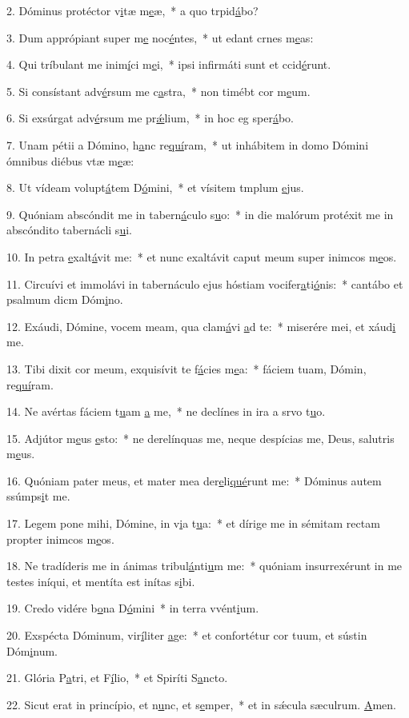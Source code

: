 2. Dóminus protéctor v\uline{i}tæ m\uline{e}æ,~* a quo trpid\uline{á}bo?\par 
3. Dum apprópiant super m\uline{e} noc\uline{é}ntes,~* ut edant crnes m\uline{e}as:\par 
4. Qui tríbulant me inim\uline{í}ci m\uline{e}i,~* ipsi infirmáti sunt et ccid\uline{é}runt.\par 
5. Si consístant adv\uline{é}rsum me c\uline{a}stra,~* non timébt cor m\uline{e}um.\par 
6. Si exsúrgat adv\uline{é}rsum me pr\uline{ǽ}lium,~* in hoc eg sper\uline{á}bo.\par 
7. Unam pétii a Dómino, h\uline{a}nc re\uline{quí}ram,~* ut inhábitem in domo Dómini ómnibus diébus vtæ m\uline{e}æ:\par 
8. Ut vídeam volupt\uline{á}tem D\uline{ó}mini,~* et vísitem tmplum \uline{e}jus.\par 
9. Quóniam abscóndit me in tabern\uline{á}culo s\uline{u}o:~* in die malórum protéxit me in abscóndito tabernácli s\uline{u}i.\par 
10. In petra \uline{e}xalt\uline{á}vit me:~* et nunc exaltávit caput meum super inimcos m\uline{e}os.\par 
11. Circuívi et immolávi in tabernáculo ejus hóstiam vocifer\uline{a}ti\uline{ó}nis:~* cantábo et psalmum dicm Dóm\uline{i}no.\par 
12. Exáudi, Dómine, vocem meam, qua clam\uline{á}vi \uline{a}d te:~* miserére mei, et xáud\uline{i} me.\par 
13. Tibi dixit cor meum, exquisívit te f\uline{á}cies m\uline{e}a:~* fáciem tuam, Dómin, re\uline{quí}ram.\par 
14. Ne avértas fáciem t\uline{u}am \uline{a} me,~* ne declínes in ira a srvo t\uline{u}o.\par 
15. Adjútor m\uline{e}us \uline{e}sto:~* ne derelínquas me, neque despícias me, Deus, salutris m\uline{e}us.\par 
16. Quóniam pater meus, et mater mea der\uline{e}li\uline{qué}runt me:~* Dóminus autem ssúmps\uline{i}t me.\par 
17. Legem pone mihi, Dómine, in v\uline{i}a t\uline{u}a:~* et dírige me in sémitam rectam propter inimcos m\uline{e}os.\par 
18. Ne tradíderis me in ánimas tribul\uline{á}nti\uline{u}m me:~* quóniam insurrexérunt in me testes iníqui, et mentíta est inítas s\uline{i}bi.\par 
19. Credo vidére b\uline{o}na D\uline{ó}mini~* in terra vvént\uline{i}um.\par 
20. Exspécta Dóminum, vir\uline{í}liter \uline{a}ge:~* et confortétur cor tuum, et sústin Dóm\uline{i}num.\par 
21. Glória P\uline{a}tri, et F\uline{í}lio,~* et Spiríti S\uline{a}ncto.\par 
22. Sicut erat in princípio, et n\uline{u}nc, et s\uline{e}mper,~* et in sǽcula sæculrum. \uline{A}men.\par 
